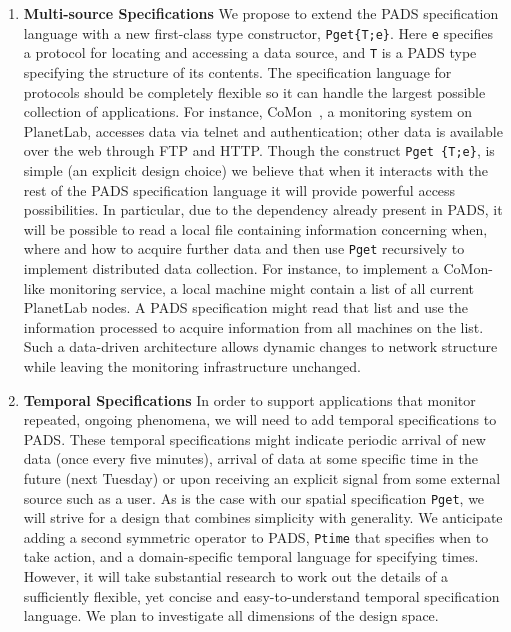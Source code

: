 \begin{enumerate}
\item {\bf Multi-source Specifications}  
We propose to extend the PADS specification language with a new
first-class type constructor, \texttt{Pget\{T;e\}}.  Here \texttt{e}
specifies a protocol for locating and accessing a data source, and
\texttt{T} is a PADS type specifying the structure of its contents.
The specification language for protocols should be completely flexible
so it can handle the largest possible collection of applications.  For
instance, CoMon~\cite{comon}, a monitoring system on PlanetLab, accesses data via telnet and authentication; other
data is available over the web through FTP and HTTP.  
Though the construct \texttt{Pget \{T;e\}}, 
is simple (an explicit design choice) we believe that 
when it interacts with the rest of the PADS
specification language it will provide powerful access possibilities.
In particular, due to the dependency already present in PADS, it will
be possible to read a local file containing information
concerning when, where and how to acquire further data and
then use \texttt{Pget} recursively to implement distributed data collection. 
For instance, to implement a CoMon-like monitoring
service, a local machine might contain a list of all current
PlanetLab nodes.  A PADS specification might read that list and use
the information processed to acquire information from all machines on
the list.  Such a data-driven architecture allows dynamic changes
to network structure while leaving the monitoring infrastructure unchanged.

\item {\bf Temporal Specifications}
In order to support applications that monitor repeated, ongoing phenomena, we
will need to add temporal specifications to PADS.  These
temporal specifications might indicate periodic arrival of new data
(once every five minutes), arrival of data at some specific time in
the future (next Tuesday) or upon receiving an explicit signal from
some external source such as a user.  
As is the case with our spatial specification
\texttt{Pget}, we will strive for a design that combines simplicity
with generality.  We anticipate adding a second symmetric operator to PADS,
\texttt{Ptime} that specifies when to take action, and a 
domain-specific temporal language for specifying times.  However, 
it will take substantial research
to work out the details of a sufficiently flexible, yet concise
and easy-to-understand temporal specification language. 
We plan to investigate all dimensions of the design space.


\end{enumerate}
